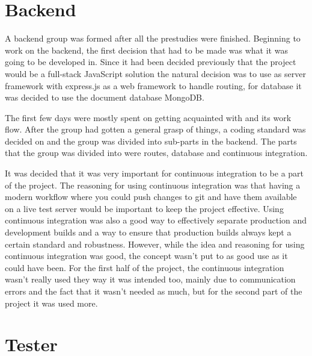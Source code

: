 \section{Backend}
A backend group was formed after all the prestudies were finished.
Beginning to work on the backend, the first decision that had to be made was what it was going to be developed in. Since it had been decided previously that the project would be a full-stack JavaScript solution the natural decision was to use \nodejs{} as server framework with express.js as a web framework to handle routing, for database it was decided to use the document database MongoDB.

The first few days were mostly spent on getting acquainted with \nodejs{} and its work flow.
After the group had gotten a general grasp of things, a coding standard was decided on and the group was divided into sub-parts in the backend.
The parts that the group was divided into were routes, database and continuous integration.

It was decided that it was very important for continuous integration to be a part of the project. The reasoning for using continuous integration was that having a modern workflow where you could push changes to git and have them available on a live test server would be important to keep the project effective. Using continuous integration was also a good way to effectively separate production and development builds and a way to ensure that production builds always kept a certain standard and robustness.
However, while the idea and reasoning for using continuous integration was good, the concept wasn't put to as good use as it could have been. For the first half of the project, the continuous integration wasn't really used they way it was intended too, mainly due to communication errors and the fact that it wasn't needed as much, but for the second part of the project it was used more.

\section{Tester}
